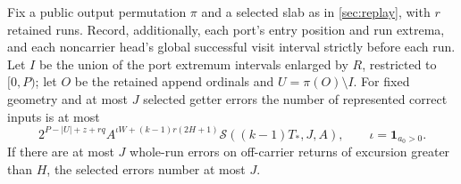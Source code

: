 \begin{theorem}\label{thm:getter-replay}
Fix a public output permutation $\pi$ and a selected slab as in
\cref{sec:replay}, with $r$ retained runs. Record, additionally, each port's
entry position and run extrema, and each noncarrier head's global successful
visit interval strictly before each run. Let $I$ be the union of the port
extremum intervals enlarged by $R$, restricted to $[0,P)$; let $O$ be the
retained append ordinals and $U=\pi(O)\setminus I$. For fixed geometry and
at most $J$ selected getter errors the number of represented correct inputs
is at most
\[
 2^{P-|U|+z+rq}A^{\iota W+(k-1)r(2H+1)}
 \mathcal S((k-1)T_*,J,A),\qquad \iota=\mathbf1_{a_0>0}.
\]
If there are at most $J$ whole-run errors on off-carrier returns of excursion
greater than $H$, the selected errors number at most $J$.
\end{theorem}
